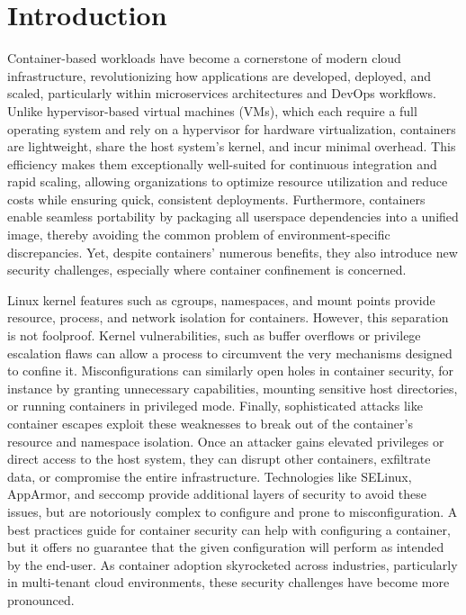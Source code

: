 \section{Introduction}

Container-based workloads have become a cornerstone of modern cloud infrastructure, revolutionizing how applications are developed, deployed, and scaled, particularly within microservices architectures and DevOps workflows. Unlike hypervisor-based virtual machines (VMs), which each require a full operating system and rely on a hypervisor for hardware virtualization, containers are lightweight, share the host system’s kernel, and incur minimal overhead. This efficiency makes them exceptionally well-suited for continuous integration and rapid scaling, allowing organizations to optimize resource utilization and reduce costs while ensuring quick, consistent deployments. Furthermore, containers enable seamless portability by packaging all userspace dependencies into a unified image, thereby avoiding the common problem of environment-specific discrepancies. Yet, despite containers’ numerous benefits, they also introduce new security challenges, especially where container confinement is concerned.

Linux kernel features such as cgroups, namespaces, and mount points provide resource, process, and network isolation for containers. However, this separation is not foolproof. Kernel vulnerabilities, such as buffer overflows or privilege escalation flaws can allow a process to circumvent the very mechanisms designed to confine it. Misconfigurations can similarly open holes in container security, for instance by granting unnecessary capabilities, mounting sensitive host directories, or running containers in privileged mode. Finally, sophisticated attacks like container escapes exploit these weaknesses to break out of the container’s resource and namespace isolation. Once an attacker gains elevated privileges or direct access to the host system, they can disrupt other containers, exfiltrate data, or compromise the entire infrastructure. Technologies like SELinux, AppArmor, and seccomp provide additional layers of security to avoid these issues, but are notoriously complex to configure and prone to misconfiguration. A best practices guide for container security  \cite{CIS} can help with configuring a container, but it offers no guarantee that the given configuration will perform as intended by the end-user. As container adoption skyrocketed across industries, particularly in multi-tenant cloud environments, these security challenges have become more pronounced.

